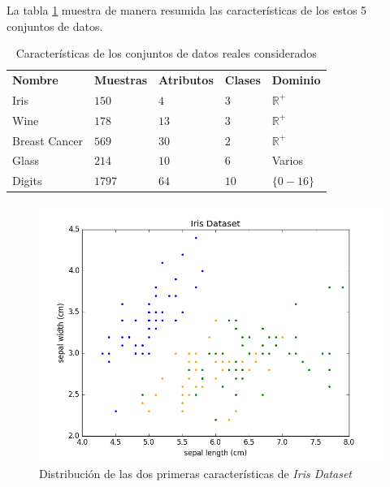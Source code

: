 La tabla \ref{tab:tabla7} muestra de manera resumida las características de los estos 5 conjuntos de datos.

\begin{table}[h]
	\centering
	\setlength{\arrayrulewidth}{1mm}
	\setlength{\tabcolsep}{10pt}
	\renewcommand{\arraystretch}{0.8}
	
	\begin{tabular}{ >{\centering\arraybackslash}m{2.5cm}  >{\centering\arraybackslash}m{1.5cm}>{\centering\arraybackslash}m{1.5cm}>{\centering\arraybackslash}m{1.5cm}>{\centering\arraybackslash}m{1.5cm}}
		\hline
		\rowcolor{black}
		\multicolumn{5}{c}{\bf \color{white}{Conjuntos de datos reales}}\\
		\hline
		\rowcolor{gray!50}
		\textbf{Nombre} & \textbf{Muestras} & \textbf{Atributos} & \textbf{Clases} & \textbf{Dominio} \\
		Iris & $150$ & $4$ & $3$ & $\mathbb{R}^+$ \\
		Wine & $178$ & $13$ & $3$ & $\mathbb{R}^+$ \\
		Breast Cancer & $569$ & $30$ & $2$ & $\mathbb{R}^+$ \\
		Glass & $214$ & $10$ & $6$ & Varios \\
		Digits & $1797$ & $64$ & $10$ & $\{0-16\}$ \\
		\hline
		
	\end{tabular}
	\caption{Características de los conjuntos de datos reales considerados}
	\label{tab:tabla7}
\end{table}

\begin{figure}[!h]
	\centering
	\includegraphics[scale=0.32]{imagenes/c6/IrisSet}
	\caption{Distribución de las dos primeras características de \textit{Iris Dataset}}\label{fig:figure27}
\end{figure}

